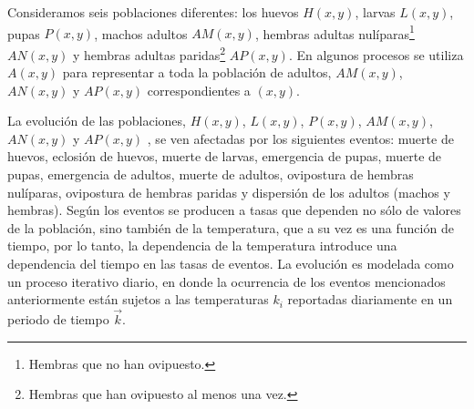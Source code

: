 Consideramos seis poblaciones diferentes: los huevos $H(x,y)$, larvas $L(x,y)$, pupas $P(x,y)$,
machos adultos $AM(x,y)$, hembras adultas nulíparas\footnote{Hembras que no han ovipuesto.}
$AN(x,y)$ y hembras adultas paridas\footnote{Hembras que han ovipuesto al menos una vez.} $AP(x,y)$. En algunos procesos se utiliza $A(x, y)$ para representar a toda la población de adultos,
$AM(x,y)$, $AN(x,y)$ y $AP(x,y)$ correspondientes a $(x, y)$.

La evolución de las poblaciones, $H(x,y)$, $L(x,y)$, $P(x,y)$, $AM(x,y)$, $AN(x,y)$ y $AP(x,y)$ ,
se ven afectadas por los siguientes eventos: muerte de huevos, eclosión de huevos, muerte de
larvas, emergencia de pupas, muerte de pupas, emergencia de adultos, muerte de adultos, ovipostura
de hembras nulíparas, ovipostura de hembras paridas y dispersión de los adultos (machos y hembras).
Según \cite{otero2006stochastic} los eventos se producen a tasas que dependen no sólo de valores
de la población, sino también de la temperatura, que a su vez es una función de tiempo, por lo
tanto, la dependencia de la temperatura introduce una dependencia del tiempo en las tasas de
eventos. La evolución es modelada como un proceso iterativo diario, en donde la ocurrencia de los
eventos mencionados anteriormente están sujetos a las temperaturas $k_{i}$ reportadas diariamente
en un periodo de tiempo $\vec{k}$.








